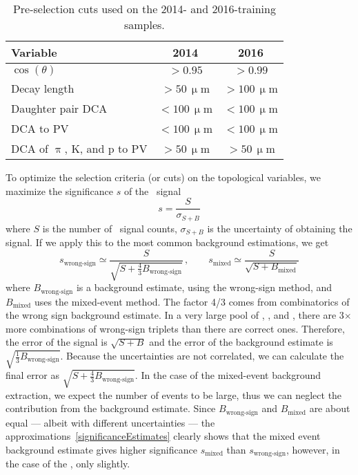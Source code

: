 \begin{table}[!htb]
\caption{\label{tab:preoptimizationCuts} Pre-selection cuts used on the 2014- and 2016-training samples. }
\begin{center}

\begin{tabular}{lcc}
\toprule
Variable & 2014 & 2016 \\
\midrule
$\cos(\theta)$ & $> 0.95$ & $> 0.99$ \\
Decay length & $> 50\,\upmu$m & $> 100\,\upmu$m \\
Daughter pair DCA & $< 100\,\upmu$m & $< 100\,\upmu$m \\
DCA to PV & $< 100\,\upmu$m &  $< 100\,\upmu$m \\
DCA of $\uppi$, K, and p to PV & $> 50\,\upmu$m & $> 50\,\upmu$m \\
\bottomrule
\end{tabular}

\end{center}
\end{table}

To optimize the selection criteria (or cuts) on the topological variables, we maximize the significance $s$ of the \Lambdac\ signal
\begin{equation} \label{significance}
 s = \frac{S}{\sigma_{S+B}}
\end{equation}
where $S$ is the number of \Lambdac\ signal counts, $\sigma_{S+B}$ is the uncertainty of obtaining the signal.
If we apply this to the most common background estimations, we get
\begin{equation} \label{significanceEstimates}
  s_\text{wrong-sign} \simeq \frac{S}{\sqrt{S+\frac{4}{3}B_\text{wrong-sign}}}\,, \qquad
 s_\text{mixed} \simeq \frac{S}{\sqrt{S + B_\text{mixed}}} 
\end{equation}
where $B_\text{wrong-sign}$ is a background estimate, using the wrong-sign method, and $B_\text{mixed}$ uses the mixed-event method. The factor 4/3 comes from combinatorics of the wrong sign background estimate. In a very large pool of \pipm, \Kmp, and \ppm, there are 3$\times$ more combinations of wrong-sign triplets than there are correct ones. Therefore, the error of the signal is $\sqrt{S + B}$ and the error of the background estimate is $\sqrt{\frac{1}{3}B_\text{wrong-sign}}$\@. Because the uncertainties are not correlated, we can calculate the final error as $\sqrt{S+\frac{4}{3}B_\text{wrong-sign}}$\@. In the case of the mixed-event background extraction, we expect the number of events to be large, thus we can neglect the contribution from the background estimate. Since $B_\text{wrong-sign}$ and $B_\text{mixed}$ are about equal --- albeit with different uncertainties --- the approximations~\eqref{significanceEstimates} clearly shows that the mixed event background estimate gives higher significance $s_\text{mixed}$ than $s_\text{wrong-sign}$, however, in the case of the \Lambdac, only slightly.

